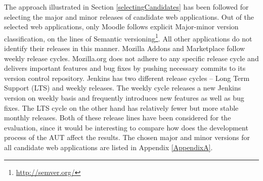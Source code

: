  \begin{table}
  \centering
  \caption{Overview of evaluation candidate web applications}
  \label{appcandidates}
  \end{table}

The approach illustrated in Section \ref{selectingCandidates} has been followed for selecting the major and minor releases of candidate web applications. Out of the selected web applications, only Moodle follows explicit Major-minor version classification, on the lines of Semantic versioning\footnote{\url{http://semver.org/}}. All other applications do not identify their releases in this manner. Mozilla Addons and Marketplace follow weekly release cycles. Mozilla.org does not adhere to any specific release cycle and delivers important features and bug fixes by pushing necessary commits to its version control repository. Jenkins has two different release cycles -- Long Term Support (LTS) and weekly releases. The weekly cycle releases a new Jenkins version on weekly basis and frequently introduces new features as well as bug fixes. The LTS cycle on the other hand has relatively fewer but more stable monthly releases. Both of these release lines have been considered for the evaluation, since it would be interesting to compare how does the development process of the AUT affect the results. The chosen major and minor versions for all candidate web applications are listed in Appendix \ref{AppendixA}.

